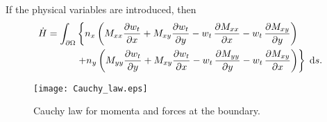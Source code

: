 \documentclass[preprint,12pt]{elsarticle}
\begin{document}
If the physical variables are introduced, then  
\begin{align}
\dot{H} = \int_{\partial \Omega}  & \left\{  n_x \left(M_{xx} \diffp{w_t}{x} + M_{xy} \diffp{w_t}{y} - w_t \, \diffp{M_{xx} }{x}   - w_t \, \diffp{M_{xy}}{y}\right)
\right.  \nonumber\\
&  \left. +n_y \left(M_{yy} \diffp{w_t}{y} + M_{xy} \diffp{w_t}{x} - w_t \, \diffp{M_{yy}}{y} - w_t\, \diffp{M_{xy}}{x} \right) \right\} \d{s}.
\end{align}

\begin{figure}
	\centering
	\texttt{[image: Cauchy\_law.eps]}
	\caption{Cauchy law for momenta and forces at the boundary.}
	\label{fig:Cauchy_law}
\end{figure}
\end{document}
